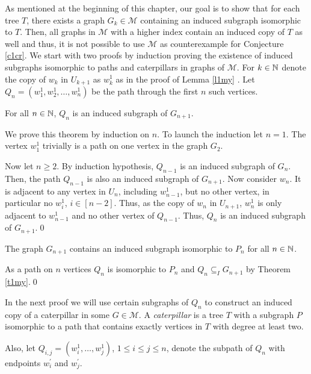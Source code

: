 As mentioned at the beginning of this chapter, our goal is to show that for each tree $T$, there exists a graph $G_k\in\mathcal{M}$ containing an induced subgraph isomorphic to $T$. Then, all graphs in $\mathcal{M}$ with a higher index contain an induced copy of $T$ as well and thus, it is not possible to use $\mathcal{M}$ as counterexample for Conjecture \ref{c1cr}.
We start with two proofs by induction proving the existence of induced subgraphs isomorphic to paths and caterpillars in graphs of $\mathcal{M}$. For $k\in\mathbb{N}$ denote the copy of $w_k$ in $U_{k+1}$ as $w_k^1$ as in the proof of Lemma \ref{l1my} . Let $Q_n =(w_1^1 ,w_2^1 ,\dots ,w_n^1)$ be the path through the first $n$ such vertices. 
\begin{thm}\label{t1my}
For all $n\in\mathbb{N}$, $Q_n$ is an induced subgraph of $G_{n+1}$.
\end{thm}
\begin{prf}
We prove this theorem by induction on $n$. To launch the induction let $n=1$. The vertex $w_1^1$ trivially is a path on one vertex in the graph $G_2$.

Now let $n\geq 2$. By induction hypothesis, $Q_{n-1}$ is an induced subgraph of $G_n$. Then, the path $Q_{n-1}$ is also an induced subgraph of $G_{n+1}$. 
Now consider $w_n$. It is adjacent to any vertex in $U_n$, including $w^1_{n-1}$, but no other vertex, in particular no $w^1_i$, $i\in [n-2]$. Thus, as the copy of $w_n$ in $U_{n+1}$, $w^1_n$ is only adjacent to $w^1_{n-1}$ and no other vertex of $Q_{n-1}$. Thus, $Q_n$ is an induced subgraph of $G_{n+1}$.\qed
\end{prf}
\newpage
\begin{cor}\label{c1my}
The graph $G_{n+1}$ contains an induced subgraph isomorphic to $P_n$ for all $n\in\mathbb{N}$.
\end{cor}
\begin{prf}
As a path on $n$ vertices $Q_n$ is isomorphic to $P_n$ and $Q_n\subseteq_I G_{n+1}$ by Theorem \ref{t1my}.\qed
\end{prf}

In the next proof we will use certain subgraphs of $Q_n$ to construct an induced copy of a caterpillar in some $G\in\mathcal{M}$. A \textit{caterpillar} is a tree $T$ with a subgraph $P$ isomorphic to a path that contains exactly vertices in $T$ with degree at least two.

Also, let $Q_{i,j}=(w_i^1 ,\dots , w_j^1 )$, $1\leq i\leq j\leq n$, denote the subpath of $Q_n$ with endpoints $w_i^\prime$ and $w_j^\prime$.

